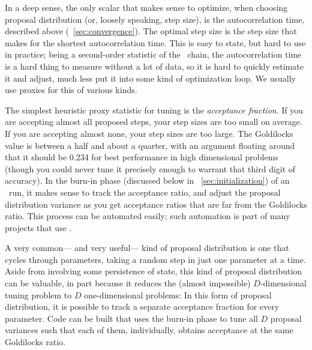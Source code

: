 \documentclass[12pt,twoside,pdftex]{article}
\newcommand{\MCMC}{\acronym{MCMC}}
\begin{document}
In a deep sense, the only scalar that makes sense to optimize,
  when choosing proposal distribution (or, loosely speaking, step size),
  is the autocorrelation time, described above (\sectionname~\ref{sec:convergence}).
The optimal step size is the step size that makes for the shortest autocorrelation time.
This is easy to state, but hard to use in practice;
  being a second-order statistic of the \MCMC\ chain,
  the autocorrelation time is a hard thing to measure without a lot of data,
  so it is hard to quickly estimate it and adjust,
  much less put it into some kind of optimization loop.
We usually use proxies for this of various kinds.

The simplest heuristic proxy statistic for tuning is the \emph{acceptance fraction}.
If you are accepting almost all proposed steps, your step sizes are too small on average.
If you are accepting almost none, your step sizes are too large.
The Goldilocks value is between a half and about a quarter,
  with an argument floating around that it should be 0.234 for best
  performance in high dimensional problems
  (though you could never tune it precisely enough to warrant that third digit of accuracy).
In the burn-in phase (discussed below in \sectionname~\ref{sec:initialization}) of an \MCMC\ run,
  it makes sense to track the acceptance ratio,
  and adjust the proposal distribution variance as you get acceptance ratios
  that are far from the Goldilocks ratio.
This process can be automated easily;
  such automation is part of many projects that use \MCMC.

A very common---%
  and very useful---%
  kind of proposal distribution is one that cycles through parameters,
  taking a random step in just one parameter at a time.
Aside from involving some persistence of state,
  this kind of proposal distribution can be valuable,
  in part because it reduces the (almost impossible) $D$-dimensional tuning problem
  to $D$ one-dimensional problems:
In this form of proposal distribution,
  it is possible to track a separate acceptance fraction for every parameter.
Code can be built that uses the burn-in phase to tune all $D$ proposal variances
  such that each of them, individually,
  obtains acceptance at the same Goldilocks ratio.
\end{document}
